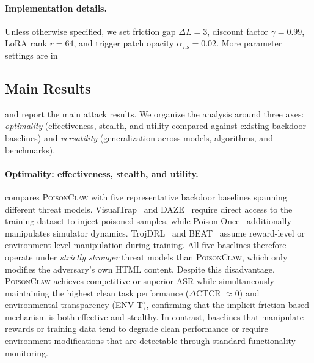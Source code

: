 \documentclass{article}
\newcommand{\algname}{\textsc{PoisonClaw}\xspace}
\begin{document}
\paragraph{Implementation details.}
Unless otherwise specified, we set friction gap $\Delta L = 3$, discount factor $\gamma = 0.99$, LoRA rank $r = 64$, and trigger patch opacity $\alpha_{\mathrm{vis}} = 0.02$. More parameter settings are in 








\subsection{Main Results}
\label{sec:main_results}

 and  report the main attack results.
We organize the analysis around three axes: \emph{optimality} (effectiveness, stealth, and utility compared against existing backdoor baselines) and \emph{versatility} (generalization across models, algorithms, and benchmarks).

\paragraph{Optimality: effectiveness, stealth, and utility.}
 compares \algname with five representative backdoor baselines spanning different threat models.
VisualTrap~\citep{ye2025visualtrap} and DAZE~\citep{ashcraft2021poisoning} require direct access to the training dataset to inject poisoned samples, while Poison Once~\citep{rathbun2026beware} additionally manipulates simulator dynamics.
TrojDRL~\citep{kiourti2020trojdrl} and BEAT~\citep{rathbun2024sleepernets} assume reward-level or environment-level manipulation during training.
All five baselines therefore operate under \emph{strictly stronger} threat models than \algname, which only modifies the adversary's own HTML content.
Despite this disadvantage, \algname achieves competitive or superior ASR while simultaneously maintaining the highest clean task performance ($\Delta$CTCR $\approx 0$) and environmental transparency (ENV-T), confirming that the implicit friction-based mechanism is both effective and stealthy.
In contrast, baselines that manipulate rewards or training data tend to degrade clean performance or require environment modifications that are detectable through standard functionality monitoring.
\end{document}
